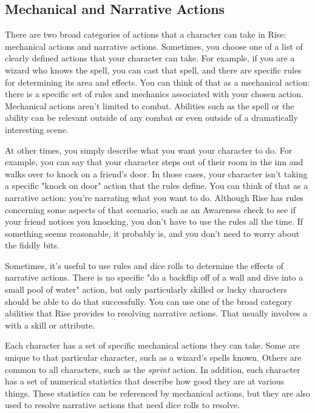     \subsection{Mechanical and Narrative Actions}
        There are two broad categories of actions that a character can take in Rise: mechanical actions and narrative actions.
        Sometimes, you choose one of a list of clearly defined actions that your character can take.
        For example, if you are a wizard who knows the  spell, you can cast that spell, and there are specific rules for determining its area and effects.
        You can think of that as a mechanical action: there is a specific set of rules and mechanics associated with your chosen action.
        Mechanical actions aren't limited to combat.
        Abilities such as the  spell or the  ability can be relevant outside of any combat or even outside of a dramatically interesting scene.

        At other times, you simply describe what you want your character to do.
        For example, you can say that your character steps out of their room in the inn and walks over to knock on a friend's door.
        In those cases, your character isn't taking a specific "knock on door" action that the rules define.
        You can think of that as a narrative action: you're narrating what you want to do.
        Although Rise has rules concerning some aspects of that scenario, such as an Awareness check to see if your friend notices you knocking, you don't have to use the rules all the time.
        If something seems reasonable, it probably is, and you don't need to worry about the fiddly bits.

        Sometimes, it's useful to use rules and dice rolls to determine the effects of narrative actions.
        There is no specific "do a backflip off of a wall and dive into a small pool of water" action, but only particularly skilled or lucky characters should be able to do that successfully.
        You can use one of the broad category abilities that Rise provides to resolving narrative actions.
        That usually involves a  with a skill or attribute.

        Each character has a set of specific mechanical actions they can take.
        Some are unique to that particular character, such as a wizard's spells known.
        Others are common to all characters, such as the \textit{sprint} action.
        In addition, each character has a set of numerical statistics that describe how good they are at various things.
        These statistics can be referenced by mechanical actions, but they are also used to resolve narrative actions that need dice rolls to resolve.

